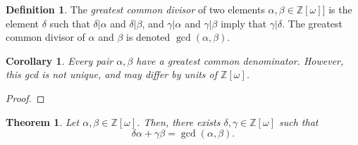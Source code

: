 \documentclass[12pt]{amsart}
\newtheorem{theorem}{Theorem}
\newtheorem{corollary}{Corollary}[theorem]
\theoremstyle{definition}
\newtheorem*{definition}{Definition}
\theoremstyle{remark}
\begin{document}
\begin{definition}\label{Def:GCD}
    The \textit{greatest common divisor} of two elements $\alpha,\beta\in\mathbb{Z}[\omega]]$ is the element $\delta$ such that $\delta | \alpha$ and $\delta | \beta$, and $\gamma|\alpha$ and $\gamma|\beta$ imply that $\gamma|\delta.$ The greatest common divisor of $\alpha$ and $\beta$ is denoted $\gcd(\alpha,\beta)$.
\end{definition}
\begin{corollary}\label{Cor:GcdExist}
    Every pair $\alpha,\beta$ have a greatest common denominator. However, this gcd is not unique, and may differ by units of $\mathbb{Z}[\omega]$.
\end{corollary}
\begin{proof}
    
\end{proof}
\begin{theorem}\label{Thm:Bezout}
    Let $\alpha,\beta\in\mathbb{Z}[\omega]$. Then, there exists $\delta,\gamma\in\mathbb{Z}[\omega]$ such that
    $$\delta\alpha + \gamma\beta = \gcd(\alpha,\beta).$$
\end{theorem}
\end{document}
